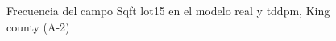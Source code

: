 \begin{figure}[H]
    \centering
    
    \caption{Frecuencia del campo Sqft lot15 en el modelo real y tddpm, King county (A-2)}
    \label{frecuency-tddpm-sqft lot15}
\end{figure}